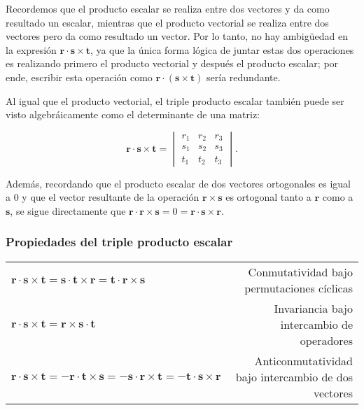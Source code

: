 \documentclass[12pt]{article}
\begin{document}
Recordemos que el producto escalar se realiza entre dos vectores y da como resultado un escalar, mientras que el producto vectorial se realiza entre dos vectores pero da como resultado un vector. Por lo tanto, no hay ambigüedad en la expresión $\mathbf{r}\cdot\mathbf{s}\times\mathbf{t}$, ya que la única forma lógica de juntar estas dos operaciones es realizando primero el producto vectorial y después el producto escalar; por ende, escribir esta operación como $\mathbf{r}\cdot(\mathbf{s}\times\mathbf{t})$ sería redundante.

Al igual que el producto vectorial, el triple producto escalar también puede ser visto algebráicamente como el determinante de una matriz:

$$\mathbf{r}\cdot\mathbf{s}\times\mathbf{t} = \begin{vmatrix} r_1&r_2&r_3 \\ s_1&s_2&s_3 \\ t_1&t_2&t_3 \end{vmatrix}.$$

    Además, recordando que el producto escalar de dos vectores ortogonales es igual a $0$ y que el vector resultante de la operación $\mathbf{r}\times\mathbf{s}$ es ortogonal tanto a $\mathbf{r}$ como a $\mathbf{s}$, se sigue directamente que $\mathbf{r}\cdot\mathbf{r}\times\mathbf{s}=0=\mathbf{r}\cdot\mathbf{s}\times\mathbf{r}$.



\subsubsection{Propiedades del triple producto escalar} \label{Prop:Triple_producto_escalar}

\begin{center}
\begin{tabular}{lr}
    $\mathbf{r}\cdot\mathbf{s}\times\mathbf{t} = \mathbf{s}\cdot\mathbf{t}\times\mathbf{r} = \mathbf{t}\cdot\mathbf{r}\times\mathbf{s}$ & Conmutatividad bajo permutaciones cíclicas \\
    $\mathbf{r}\cdot\mathbf{s}\times\mathbf{t} = \mathbf{r}\times\mathbf{s}\cdot\mathbf{t}$ & Invariancia bajo intercambio de operadores \\
    $\mathbf{r}\cdot\mathbf{s}\times\mathbf{t} = -\mathbf{r}\cdot\mathbf{t}\times\mathbf{s} = -\mathbf{s}\cdot\mathbf{r}\times\mathbf{t} = -\mathbf{t}\cdot\mathbf{s}\times\mathbf{r}$ & Anticonmutatividad bajo intercambio de dos vectores \\
\end{tabular}
\end{center}
\end{document}
